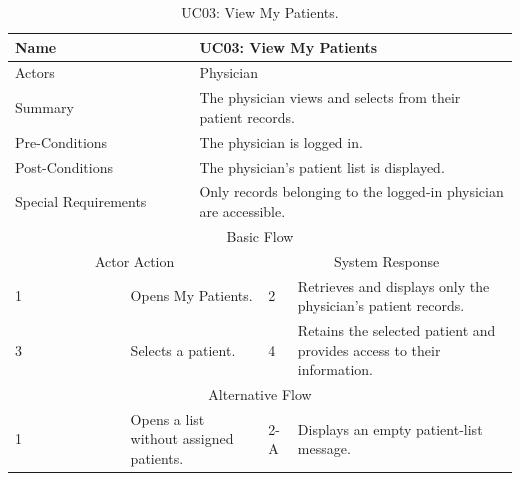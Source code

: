 \begin{table}[htbp]
\centering
\small
\caption{UC03: View My Patients.}
\label{tab:kashaf:uc03}
\begin{tabular}{|p{}|p{}|p{}|p{}|p{}|}
\hline
\multicolumn{2}{|p{\dimexpr0.225\textwidth+2\tabcolsep+\arrayrulewidth\relax}|}{Name} & \multicolumn{3}{p{\dimexpr0.575\textwidth+4\tabcolsep+2\arrayrulewidth\relax}|}{UC03: View My Patients} \\ \hline
\multicolumn{2}{|p{\dimexpr0.225\textwidth+2\tabcolsep+\arrayrulewidth\relax}|}{Actors} & \multicolumn{3}{p{\dimexpr0.575\textwidth+4\tabcolsep+2\arrayrulewidth\relax}|}{Physician} \\ \hline
\multicolumn{2}{|p{\dimexpr0.225\textwidth+2\tabcolsep+\arrayrulewidth\relax}|}{Summary} & \multicolumn{3}{p{\dimexpr0.575\textwidth+4\tabcolsep+2\arrayrulewidth\relax}|}{The physician views and selects from their patient records.} \\ \hline
\multicolumn{2}{|p{\dimexpr0.225\textwidth+2\tabcolsep+\arrayrulewidth\relax}|}{Pre-Conditions} & \multicolumn{3}{p{\dimexpr0.575\textwidth+4\tabcolsep+2\arrayrulewidth\relax}|}{The physician is logged in.} \\ \hline
\multicolumn{2}{|p{\dimexpr0.225\textwidth+2\tabcolsep+\arrayrulewidth\relax}|}{Post-Conditions} & \multicolumn{3}{p{\dimexpr0.575\textwidth+4\tabcolsep+2\arrayrulewidth\relax}|}{The physician's patient list is displayed.} \\ \hline
\multicolumn{2}{|p{\dimexpr0.225\textwidth+2\tabcolsep+\arrayrulewidth\relax}|}{Special Requirements} & \multicolumn{3}{p{\dimexpr0.575\textwidth+4\tabcolsep+2\arrayrulewidth\relax}|}{Only records belonging to the logged-in physician are accessible.} \\ \hline
\multicolumn{5}{|c|}{Basic Flow} \\ \hline
\multicolumn{3}{|c|}{Actor Action} & \multicolumn{2}{c|}{System Response} \\ \hline
1 & \multicolumn{2}{p{\dimexpr0.37\textwidth+2\tabcolsep+\arrayrulewidth\relax}|}{Opens My Patients.} & 2 & Retrieves and displays only the physician's patient records. \\ \hline
3 & \multicolumn{2}{p{\dimexpr0.37\textwidth+2\tabcolsep+\arrayrulewidth\relax}|}{Selects a patient.} & 4 & Retains the selected patient and provides access to their information. \\ \hline
\multicolumn{5}{|c|}{Alternative Flow} \\ \hline
1 & \multicolumn{2}{p{\dimexpr0.37\textwidth+2\tabcolsep+\arrayrulewidth\relax}|}{Opens a list without assigned patients.} & 2-A & Displays an empty patient-list message. \\ \hline
\end{tabular}
\end{table}

